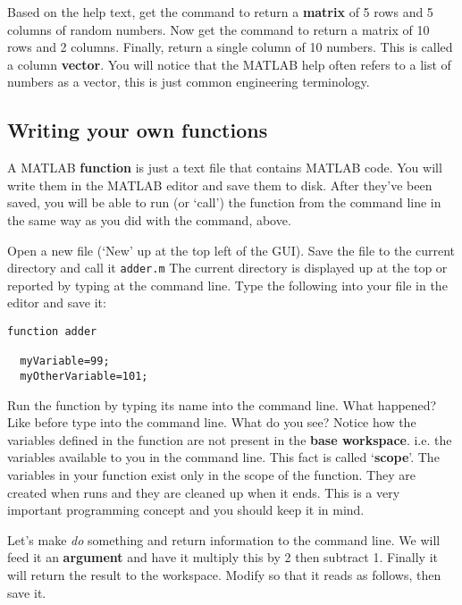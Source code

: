 \documentclass{article}
\begin{document}
Based on the help text, get the  command to return a \textbf{matrix} of 5 rows and 5 columns of random numbers. Now get the  command to return a matrix of 10 rows and 2 columns. Finally, return a single column of 10 numbers. This is called a column \textbf{vector}. You will notice that the MATLAB help often refers to a list of numbers as a vector, this is just common engineering terminology. 



\subsection*{Writing your own functions}
A MATLAB \textbf{function} is just a text file that contains MATLAB code. You will write them in the MATLAB editor and save them to disk. 
After they've been saved, you will be able to run (or `call') the function from the command line in the same way as you did with the 
 command, above. 

Open a new file (`New' up at the top left of the GUI). Save the file to the current directory and call it \verb|adder.m| 
The current directory is displayed up at the top or reported by typing  at the command line. Type the following into
your file in the editor and save it:

\begin{lstlisting}
function adder

  myVariable=99;
  myOtherVariable=101;
\end{lstlisting}

Run the function by typing its name into the command line. What happened? Like before type  into the command line. 
What do you see? Notice how the variables defined in the  function are not present in the \textbf{base workspace}. 
i.e. the variables available to you in the command line. This fact is called `\textbf{scope}'. The variables in your  
function exist only in the scope of the  function. They are created when  runs and they are cleaned 
up when it ends. This is a very important programming concept and you should keep it in mind.

Let's make  \textit{do} something and return information to the command line. We will feed it an 
\textbf{argument} and have it multiply this by 2 then subtract 1. Finally it will return the result to  the workspace. 
Modify  so that it reads as follows, then save it.
\end{document}
